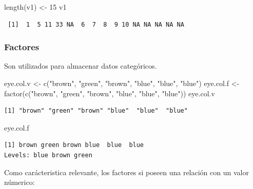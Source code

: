 \documentclass[
  letterpaper,
  DIV=11,
  numbers=noendperiod]{scrartcl}
\newenvironment{Shaded}{\begin{snugshade}}{\end{snugshade}}
\newcommand{\DecValTok}[1]{\textcolor[rgb]{0.68,0.00,0.00}{#1}}
\newcommand{\FunctionTok}[1]{\textcolor[rgb]{0.28,0.35,0.67}{#1}}
\newcommand{\NormalTok}[1]{\textcolor[rgb]{0.00,0.23,0.31}{#1}}
\newcommand{\OtherTok}[1]{\textcolor[rgb]{0.00,0.23,0.31}{#1}}
\newcommand{\StringTok}[1]{\textcolor[rgb]{0.13,0.47,0.30}{#1}}
\begin{document}
\begin{Shaded}
\begin{Highlighting}[]
\FunctionTok{length}\NormalTok{(v1) }\OtherTok{\textless{}{-}} \DecValTok{15}
\NormalTok{v1}
\end{Highlighting}
\end{Shaded}

\begin{verbatim}
 [1]  1  5 11 33 NA  6  7  8  9 10 NA NA NA NA NA
\end{verbatim}

\subsubsection{Factores}\label{factores}

Son utilizados para almacenar datos categóricos.

\begin{Shaded}
\begin{Highlighting}[]
\NormalTok{eye.col.v }\OtherTok{\textless{}{-}} \FunctionTok{c}\NormalTok{(}\StringTok{"brown"}\NormalTok{, }\StringTok{"green"}\NormalTok{, }\StringTok{"brown"}\NormalTok{, }\StringTok{"blue"}\NormalTok{, }\StringTok{"blue"}\NormalTok{, }\StringTok{"blue"}\NormalTok{)     }
\NormalTok{eye.col.f }\OtherTok{\textless{}{-}} \FunctionTok{factor}\NormalTok{(}\FunctionTok{c}\NormalTok{(}\StringTok{"brown"}\NormalTok{, }\StringTok{"green"}\NormalTok{, }\StringTok{"brown"}\NormalTok{, }\StringTok{"blue"}\NormalTok{, }\StringTok{"blue"}\NormalTok{, }\StringTok{"blue"}\NormalTok{)) }
\NormalTok{eye.col.v}
\end{Highlighting}
\end{Shaded}

\begin{verbatim}
[1] "brown" "green" "brown" "blue"  "blue"  "blue" 
\end{verbatim}

\begin{Shaded}
\begin{Highlighting}[]
\NormalTok{eye.col.f}
\end{Highlighting}
\end{Shaded}

\begin{verbatim}
[1] brown green brown blue  blue  blue 
Levels: blue brown green
\end{verbatim}

Como carácteristica relevante, los factores si poseen una relación con
un valor númerico:
\end{document}
